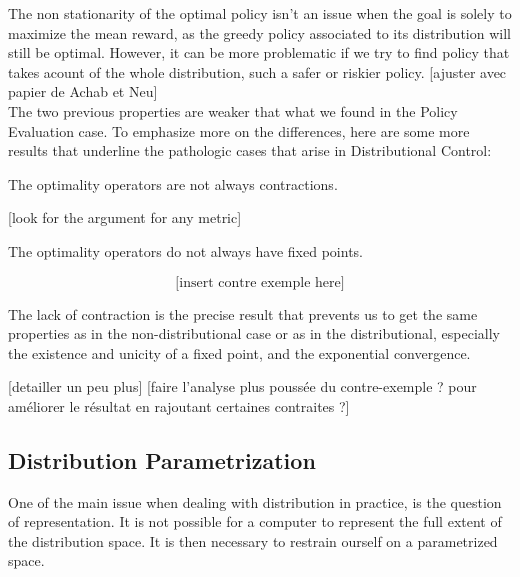 The non stationarity of the optimal policy isn’t an issue when the goal is solely to maximize the mean reward, as the greedy policy associated to its distribution will still be optimal. However, it can be more problematic if we try to find policy that takes acount of the whole distribution, such a safer or riskier policy. [ajuster avec papier de Achab et Neu]\\

The two previous properties are weaker that what we found in the Policy Evaluation case. To emphasize more on the differences, here are some more results that underline the pathologic cases that arise in Distributional Control:

\begin{proposition}
    The optimality operators are not always contractions.
\end{proposition}
[look for the argument for any metric]

\begin{proposition}
    The optimality operators do not always have fixed points.
\end{proposition}

\[ \text{[insert contre exemple here]} \]

The lack of contraction is the precise result that prevents us to get the same properties as in the non-distributional case or as in the distributional, especially the existence and unicity of a fixed point, and the exponential convergence.

[detailler un peu plus] [faire l’analyse plus poussée du contre-exemple ? pour améliorer le résultat en rajoutant certaines contraites ?]






















\subsection{Distribution Parametrization}

One of the main issue when dealing with distribution in practice, is the question of representation. It is not possible for a computer to represent the full extent of the distribution space. It is then necessary to restrain ourself on a parametrized space.


